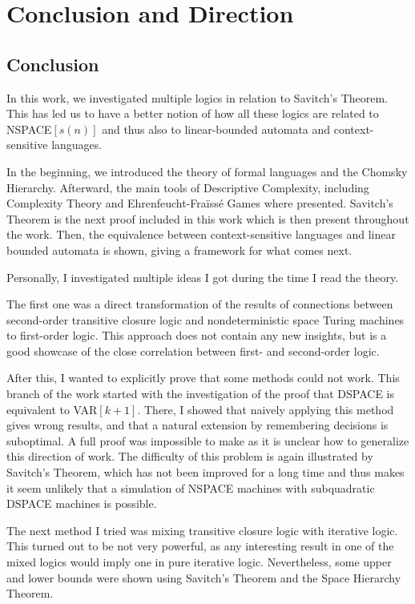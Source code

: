 \chapter{Conclusion and Direction}\label{ch:conclusion-and-direction}

\section{Conclusion}\label{sec:conclusion}
In this work, we investigated multiple logics in relation to Savitch's Theorem.
This has led us to have a better notion of how all these logics are related to NSPACE$[s(n)]$ and thus also to linear-bounded automata and context-sensitive languages.

In the beginning, we introduced the theory of formal languages and the Chomsky Hierarchy.
Afterward, the main tools of Descriptive Complexity, including Complexity Theory and Ehrenfeucht-Fraïssé Games where presented.
Savitch's Theorem is the next proof included in this work which is then present throughout the work.
Then, the equivalence between context-sensitive languages and linear bounded automata is shown, giving a framework for what comes next.

Personally, I investigated multiple ideas I got during the time I read the theory.

The first one was a direct transformation of the results of connections between second-order transitive closure logic and nondeterministic space Turing machines to first-order logic.
This approach does not contain any new insights, but is a good showcase of the close correlation between first- and second-order logic.

After this, I wanted to explicitly prove that some methods could not work.
This branch of the work started with the investigation of the proof that DSPACE is equivalent to VAR$[k + 1]$.
There, I showed that naively applying this method gives wrong results, and that a natural extension by remembering decisions is suboptimal.
A full proof was impossible to make as it is unclear how to generalize this direction of work.
The difficulty of this problem is again illustrated by Savitch's Theorem, which has not been improved for a long time and thus makes it seem unlikely that a simulation of NSPACE machines with subquadratic DSPACE machines is possible.

The next method I tried was mixing transitive closure logic with iterative logic.
This turned out to be not very powerful, as any interesting result in one of the mixed logics would imply one in pure iterative logic.
Nevertheless, some upper and lower bounds were shown using Savitch's Theorem and the Space Hierarchy Theorem.

